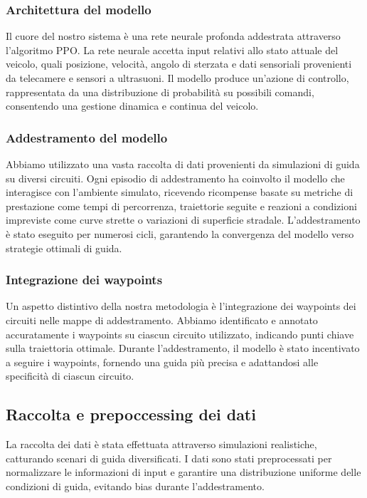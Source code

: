 \documentclass[conference]{IEEEtran}
\begin{document}
\subsubsection{Architettura del modello}
Il cuore del nostro sistema è una rete neurale profonda addestrata attraverso l'algoritmo PPO. La rete neurale accetta input relativi allo stato attuale del veicolo, quali posizione, velocità, angolo di sterzata e dati sensoriali provenienti da telecamere e sensori a ultrasuoni. Il modello produce un'azione di controllo, rappresentata da una distribuzione di probabilità su possibili comandi, consentendo una gestione dinamica e continua del veicolo.

\subsubsection{Addestramento del modello}
Abbiamo utilizzato una vasta raccolta di dati provenienti da simulazioni di guida su diversi circuiti. Ogni episodio di addestramento ha coinvolto il modello che interagisce con l'ambiente simulato, ricevendo ricompense basate su metriche di prestazione come tempi di percorrenza, traiettorie seguite e reazioni a condizioni impreviste come curve strette o variazioni di superficie stradale. L'addestramento è stato eseguito per numerosi cicli, garantendo la convergenza del modello verso strategie ottimali di guida.

\subsubsection{Integrazione dei waypoints}

Un aspetto distintivo della nostra metodologia è l'integrazione dei waypoints dei circuiti nelle mappe di addestramento.
%
Abbiamo identificato e annotato accuratamente i waypoints su ciascun circuito utilizzato, indicando punti chiave sulla traiettoria ottimale.
%
Durante l'addestramento, il modello è stato incentivato a seguire i waypoints, fornendo una guida più precisa e adattandosi alle specificità di ciascun circuito.

\subsection{Raccolta e prepoccessing dei dati}
La raccolta dei dati è stata effettuata attraverso simulazioni realistiche, catturando scenari di guida diversificati. I dati sono stati preprocessati per normalizzare le informazioni di input e garantire una distribuzione uniforme delle condizioni di guida, evitando bias durante l'addestramento.
\end{document}
